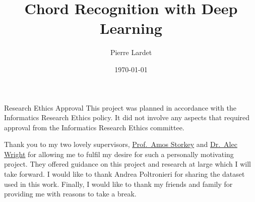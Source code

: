 \begin{preliminary}

    \title{Chord Recognition with Deep Learning}
    
    \author{Pierre Lardet}
    
    
    
    
    \date{\today}
    
    
    \maketitle
    
    \newenvironment{ethics}
       {\begin{frontenv}{Research Ethics Approval}{\LARGE}}
       {\end{frontenv}\newpage}
    
    \begin{ethics}
    This project was planned in accordance with the Informatics Research
    Ethics policy. It did not involve any aspects that required approval
    from the Informatics Research Ethics committee.
    
    \standarddeclaration
    \end{ethics}
    
    
    \begin{acknowledgements}
    Thank you to my two lovely supervisors, \hyperlink{https://homepages.inf.ed.ac.uk/amos/index.html}{Prof.~Amos Storkey} and \hyperlink{https://www.acoustics.ed.ac.uk/people/dr-alec-wright/}{Dr.~Alec Wright} for allowing me to fulfil my desire for such a personally motivating project. They offered guidance on this project and research at large which I will take forward. I would like to thank Andrea Poltronieri for sharing the dataset used in this work. Finally, I would like to thank my friends and family for providing me with reasons to take a break.
    \end{acknowledgements}
    
    
    \tableofcontents
    \end{preliminary}